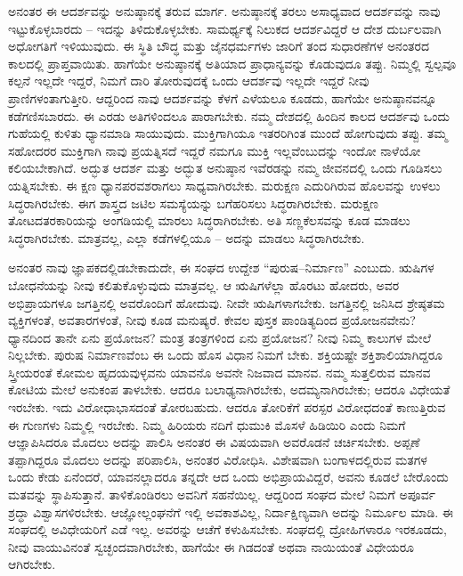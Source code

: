 ಅನಂತರ ಈ ಆದರ್ಶವನ್ನು ಅನುಷ್ಠಾನಕ್ಕೆ ತರುವ ಮಾರ್ಗ. ಅನುಷ್ಠಾನಕ್ಕೆ ತರಲು ಅಸಾಧ್ಯವಾದ ಆದರ್ಶವನ್ನು ನಾವು ಇಟ್ಟುಕೊಳ್ಳಬಾರದು – ಇದನ್ನು ತಿಳಿದುಕೊಳ್ಳಬೇಕು. ಸಾಮರ್ಥ್ಯಕ್ಕೆ ನಿಲುಕದ ಆದರ್ಶವಿದ್ದರೆ ಆ ದೇಶ ದುರ್ಬಲವಾಗಿ ಅಧೋಗತಿಗೆ ಇಳಿಯುವುದು. ಈ ಸ್ಥಿತಿ ಬೌದ್ಧ ಮತ್ತು ಜೈನಧರ್ಮಗಳು ಜಾರಿಗೆ ತಂದ ಸುಧಾರಣೆಗಳ ಅನಂತರದ ಕಾಲದಲ್ಲಿ ಪ್ರಾಪ್ತವಾಯಿತು. ಹಾಗೆಯೇ ಅನುಷ್ಠಾನಕ್ಕೆ ಅತಿಯಾದ ಪ್ರಾಧಾನ್ಯವನ್ನು ಕೊಡುವುದೂ ತಪ್ಪು. ನಿಮ್ಮಲ್ಲಿ ಸ್ವಲ್ಪವೂ ಕಲ್ಪನೆ ಇಲ್ಲದೇ ಇದ್ದರೆ, ನಿಮಗೆ ದಾರಿ ತೋರುವುದಕ್ಕೆ ಒಂದು ಆದರ್ಶವು ಇಲ್ಲದೇ ಇದ್ದರೆ ನೀವು ಪ್ರಾಣಿಗಳಂತಾಗುತ್ತೀರಿ. ಆದ್ದರಿಂದ ನಾವು ಆದರ್ಶವನ್ನು ಕೆಳಗೆ ಎಳೆಯಲೂ ಕೂಡದು, ಹಾಗೆಯೇ ಅನುಷ್ಠಾನವನ್ನೂ ಕಡೆಗಣಿಸಬಾರದು. ಈ ಎರಡು ಅತಿಗಳಿಂದಲೂ ಪಾರಾಗಬೇಕು. ನಮ್ಮ ದೇಶದಲ್ಲಿ ಹಿಂದಿನ ಕಾಲದ ಆದರ್ಶವು ಒಂದು ಗುಹೆಯಲ್ಲಿ ಕುಳಿತು ಧ್ಯಾನಮಾಡಿ ಸಾಯುವುದು. ಮುಕ್ತಿಗಾಗಿಯೂ ಇತರರಿಗಿಂತ ಮುಂದೆ ಹೋಗುವುದು ತಪ್ಪು. ತಮ್ಮ ಸಹೋದರರ ಮುಕ್ತಿಗಾಗಿ ನಾವು ಪ್ರಯತ್ನಿಸದೆ ಇದ್ದರೆ ನಮಗೂ ಮುಕ್ತಿ ಇಲ್ಲವೆಂಬುದನ್ನು ಇಂದೋ ನಾಳೆಯೋ ಕಲಿಯಬೇಕಾಗಿದೆ. ಅದ್ಭುತ ಆದರ್ಶ ಮತ್ತು ಅದ್ಭುತ ಅನುಷ್ಠಾನ ಇವೆರಡನ್ನು ನಮ್ಮ ಜೀವನದಲ್ಲಿ ಒಂದು ಗೂಡಿಸಲು ಯತ್ನಿಸಬೇಕು. ಈ ಕ್ಷಣ ಧ್ಯಾನಪರವಶರಾಗಲು ಸಾಧ್ಯವಾಗಿರಬೇಕು. ಮರುಕ್ಷಣ ಎದುರಿಗಿರುವ ಹೊಲವನ್ನು ಉಳಲು ಸಿದ್ಧರಾಗಿರಬೇಕು. ಈಗ ಶಾಸ್ತ್ರದ ಜಟಿಲ ಸಮಸ್ಯೆಯನ್ನು ಬಗೆಹರಿಸಲು ಸಿದ್ಧರಾಗಿರಬೇಕು. ಮರುಕ್ಷಣ ತೋಟದ\break ತರಕಾರಿಯನ್ನು ಅಂಗಡಿಯಲ್ಲಿ ಮಾರಲು ಸಿದ್ಧರಾಗಿರಬೇಕು. ಅತಿ ಸಣ್ಣ\break ಕೆಲಸವನ್ನು ಕೂಡ ಮಾಡಲು ಸಿದ್ಧರಾಗಿರಬೇಕು. ಮಾತ್ರವಲ್ಲ, ಎಲ್ಲಾ ಕಡೆಗಳ\-ಲ್ಲಿಯೂ – ಅದನ್ನು ಮಾಡಲು ಸಿದ್ಧರಾಗಿರಬೇಕು.

\vskip 3pt

ಅನಂತರ ನಾವು ಜ್ಞಾಪಕದಲ್ಲಿಡಬೇಕಾದುದೇ, ಈ ಸಂಘದ ಉದ್ದೇಶ “ಪುರುಷ–ನಿರ್ಮಾಣ” ಎಂಬುದು. ಋಷಿಗಳ ಬೋಧನೆಯನ್ನು ನೀವು ಕಲಿತುಕೊಳ್ಳುವುದು ಮಾತ್ರವಲ್ಲ. ಆ ಋಷಿಗಳೆಲ್ಲಾ ಹೊರಟು ಹೋದರು, ಅವರ ಅಭಿಪ್ರಾಯಗಳೂ ಜಗತ್ತಿನಲ್ಲಿ ಅವರೊಂದಿಗೆ ಹೋದುವು. ನೀವೇ ಋಷಿಗಳಾಗಬೇಕು. ಜಗತ್ತಿನಲ್ಲಿ ಜನಿಸಿದ ಶ್ರೇಷ್ಠತಮ ವ್ಯಕ್ತಿಗಳಂತೆ, ಅವತಾರಗಳಂತೆ, ನೀವು ಕೂಡ ಮನುಷ್ಯರೆ. ಕೇವಲ ಪುಸ್ತಕ ಪಾಂಡಿತ್ಯದಿಂದ ಪ್ರಯೋಜನವೇನು? ಧ್ಯಾನದಿಂದ ತಾನೇ ಏನು ಪ್ರಯೋಜನ? ಮಂತ್ರ ತಂತ್ರಗಳಿಂದ ಏನು ಪ್ರಯೋಜನ? ನೀವು ನಿಮ್ಮ ಕಾಲುಗಳ ಮೇಲೆ ನಿಲ್ಲಬೇಕು. ಪುರುಷ ನಿರ್ಮಾಣವೆಂಬ ಈ ಒಂದು ಹೊಸ ವಿಧಾನ ನಿಮಗೆ ಬೇಕು. ಶಕ್ತಿಯಷ್ಟೇ ಶಕ್ತಿಶಾಲಿಯಾಗಿದ್ದರೂ ಸ್ತ್ರೀಯರಂತೆ ಕೋಮಲ ಹೃದಯವುಳ್ಳವನು ಯಾವನೊ ಅವನೇ ನಿಜವಾದ ಮಾನವ. ನಮ್ಮ ಸುತ್ತಲಿರುವ ಮಾನವ ಕೋಟಿಯ ಮೇಲೆ ಅನುಕಂಪ ತಾಳಬೇಕು. ಆದರೂ ಬಲಾಢ್ಯನಾಗಿರಬೇಕು, ಅದಮ್ಯನಾಗಿರಬೇಕು; ಆದರೂ ವಿಧೇಯತೆ ಇರಬೇಕು. ಇದು ವಿರೋಧಾಭಾಸದಂತೆ ತೋರಬಹುದು. ಆದರೂ ತೋರಿಕೆಗೆ ಪರಸ್ಪರ ವಿರೋಧದಂತೆ ಕಾಣುತ್ತಿರುವ ಈ ಗುಣಗಳು ನಿಮ್ಮಲ್ಲಿ ಇರಬೇಕು. ನಿಮ್ಮ ಹಿರಿಯರು ನದಿಗೆ ಧುಮುಕಿ ಮೊಸಳೆ ಹಿಡಿಯಿರಿ ಎಂದು ನಿಮಗೆ ಆಜ್ಞಾಪಿಸಿದರೂ ಮೊದಲು ಅದನ್ನು ಪಾಲಿಸಿ ಅನಂತರ ಈ ವಿಷಯವಾಗಿ ಅವರೊಡನೆ ಚರ್ಚಿಸಬೇಕು. ಅಪ್ಪಣೆ ತಪ್ಪಾಗಿದ್ದರೂ ಮೊದಲು ಅದನ್ನು ಪರಿಪಾಲಿಸಿ, ಅನಂತರ ವಿರೋಧಿಸಿ. ವಿಶೇಷವಾಗಿ ಬಂಗಾಳದಲ್ಲಿರುವ ಮತಗಳ ಒಂದು ಕೇಡು ಏನೆಂದರೆ, ಯಾವನಲ್ಲಾದರೂ ತನ್ನದೇ ಆದ ಒಂದು ಅಭಿಪ್ರಾಯವಿದ್ದರೆ, ಅವನು ಕೂಡಲೆ ಬೇರೊಂದು ಮತವನ್ನು ಸ್ಥಾಪಿಸುತ್ತಾನೆ. ತಾಳಿಕೊಂಡಿರಲು ಅವನಿಗೆ ಸಹನೆಯಿಲ್ಲ. ಆದ್ದರಿಂದ ಸಂಘದ ಮೇಲೆ ನಿಮಗೆ ಅಪೂರ್ವ ಶ್ರದ್ಧಾ ವಿಶ್ವಾಸಗಳಿರಬೇಕು. ಆಜ್ಞೋಲ್ಲಂಘನೆಗೆ ಇಲ್ಲಿ ಅವಕಾಶವಿಲ್ಲ, ನಿರ್ದಾಕ್ಷಿಣ್ಯವಾಗಿ ಅದನ್ನು ನಿರ್ಮೂಲ ಮಾಡಿ. ಈ ಸಂಘದಲ್ಲಿ ಅವಿಧೇಯರಿಗೆ ಎಡೆ ಇಲ್ಲ. ಅವರನ್ನು ಆಚೆಗೆ ಕಳುಹಿಸಬೇಕು. ಸಂಘದಲ್ಲಿ ದ್ರೋಹಿಗಳಾರೂ ಇರಕೂಡದು, ನೀವು ವಾಯುವಿನಂತೆ ಸ್ವಚ್ಛಂದವಾಗಿರಬೇಕು, ಹಾಗೆಯೇ ಈ ಗಿಡದಂತೆ ಅಥವಾ ನಾಯಿಯಂತೆ ವಿಧೇಯರೂ ಆಗಿರಬೇಕು.

